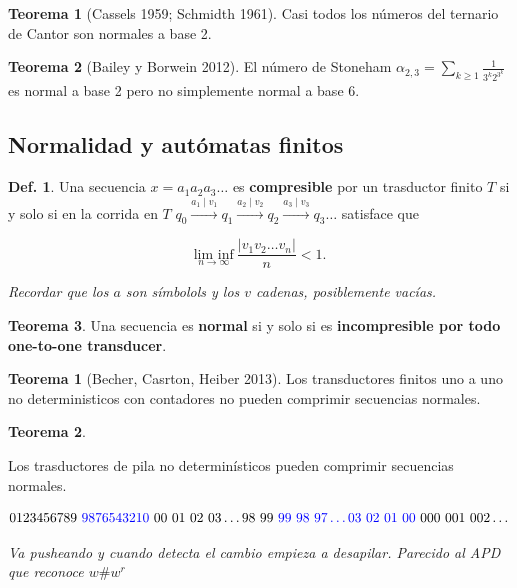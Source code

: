 \documentclass{report}
\theoremstyle{definition} %
\newtheorem{theorem}{Teorema}[chapter]
\newtheorem*{theorem*}{Teorema}
\newtheorem{definition}{Def.}[chapter]
\begin{document}
\begin{theorem}[Cassels 1959; Schmidth 1961]
    Casi todos los números del ternario de Cantor son normales a base 2.
\end{theorem}

\begin{theorem}[Bailey y Borwein 2012]
    El número de Stoneham $\alpha_{2, 3} = \sum_{k \geq 1} \frac{1}{3^k
    2^{3^k}}$ es normal a base 2 pero no simplemente normal a base 6.
\end{theorem}

\subsection{Normalidad y autómatas finitos}

\begin{definition}
    Una secuencia $x = a_1 a_2 a_3 \dots$ es \textbf{compresible} por un
    trasductor finito $T$ si y solo si en la corrida en $T$ $q_0
    \xrightarrow{a_1\mid v_1} q_1 \xrightarrow{a_2\mid v_2} q_2
    \xrightarrow{a_3\mid v_3} q_3 \dots$ satisface que

    $$\underset{n \to \infty}{\text{lim inf}}\ \frac{|v_1 v_2 \dots v_n|}{n} <
    1.$$
    
    \textit{Recordar que los $a$ son símbolols y los $v$ cadenas, posiblemente vacías.}
\end{definition}

\begin{theorem}
    Una secuencia es \textbf{normal} si y solo si es \textbf{incompresible por
    todo one-to-one transducer}.
\end{theorem}

\begin{theorem*}[Becher, Casrton, Heiber 2013]
    Los transductores finitos uno a uno no deterministicos con contadores no
    pueden comprimir secuencias normales.
\end{theorem*}

\begin{theorem*}
    
\end{theorem*}
    Los trasductores de pila no determinísticos pueden comprimir secuencias
    normales.
    
    $$
        0123456789\ \textcolor{blue}{9876543210}\
        00\ 01\ 02\ 03 \dots 98\ 99\ \textcolor{blue}{99\ 98\ 97 \dots 03\ 02\ 01\ 00\ }
        000\ 001\ 002 \dots
    $$

    \textit{Va pusheando y cuando detecta el cambio empieza a desapilar.
    Parecido al APD que reconoce $w\#w^r$}
\end{document}
